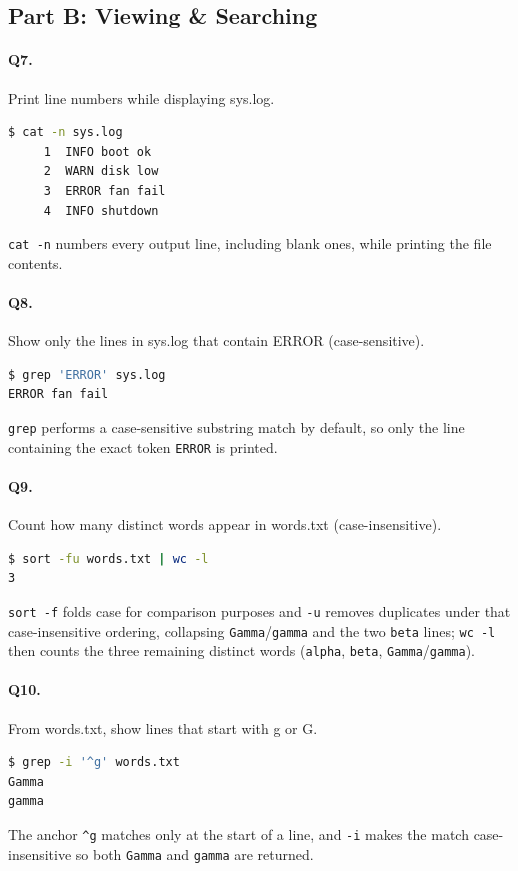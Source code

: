 \subsection{Part B: Viewing \& Searching}
\paragraph{Q7.} Print line numbers while displaying sys.log.
\begin{lstlisting}[language=bash,caption={Q7 evidence: \texttt{cat -n sys.log}},label={Listing:Q7}]
$ cat -n sys.log
     1	INFO boot ok
     2	WARN disk low
     3	ERROR fan fail
     4	INFO shutdown
\end{lstlisting}
\texttt{cat -n} numbers every output line, including blank ones, while printing the file contents.

\paragraph{Q8.} Show only the lines in sys.log that contain ERROR (case-sensitive).
\begin{lstlisting}[language=bash,caption={Q8 evidence: \texttt{grep 'ERROR' sys.log}},label={Listing:Q8}]
$ grep 'ERROR' sys.log
ERROR fan fail
\end{lstlisting}
\texttt{grep} performs a case-sensitive substring match by default, so only the line containing the exact token \texttt{ERROR} is printed.

\paragraph{Q9.} Count how many distinct words appear in words.txt (case-insensitive).
\begin{lstlisting}[language=bash,caption={Q9 evidence: \texttt{sort -fu words.txt | wc -l}},label={Listing:Q9}]
$ sort -fu words.txt | wc -l
3
\end{lstlisting}
\texttt{sort -f} folds case for comparison purposes and \texttt{-u} removes duplicates under that case-insensitive ordering, collapsing \texttt{Gamma}/\texttt{gamma} and the two \texttt{beta} lines; \texttt{wc -l} then counts the three remaining distinct words (\texttt{alpha}, \texttt{beta}, \texttt{Gamma}/\texttt{gamma}).

\paragraph{Q10.} From words.txt, show lines that start with g or G.
\begin{lstlisting}[language=bash,caption={Q10 evidence: \texttt{grep -i '\textasciicircum{}g' words.txt}},label={Listing:Q10}]
$ grep -i '^g' words.txt
Gamma
gamma
\end{lstlisting}
The anchor \texttt{\^{}g} matches only at the start of a line, and \texttt{-i} makes the match case-insensitive so both \texttt{Gamma} and \texttt{gamma} are returned.

